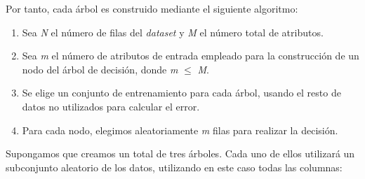 \documentclass [a4paper] {article}
\begin{document}
Por tanto, cada árbol es construido mediante el siguiente algoritmo:
\begin{enumerate}
  \item Sea \textit{N} el número de filas del \textit{dataset} y \textit{M} el número total de atributos.
  \item Sea \textit{m} el número de atributos de entrada empleado para la construcción de un nodo del árbol de decisión, donde \textit{m} $\leq$ \textit{M}.
  \item Se elige un conjunto de entrenamiento para cada árbol, usando el resto de datos no utilizados para calcular el error.
  \item Para cada nodo, elegimos aleatoriamente \textit{m} filas para realizar la decisión.
\end{enumerate}

Supongamos que creamos un total de tres árboles. Cada uno de ellos utilizará un subconjunto aleatorio de los datos, utilizando en este caso todas las columnas:
\end{document}
